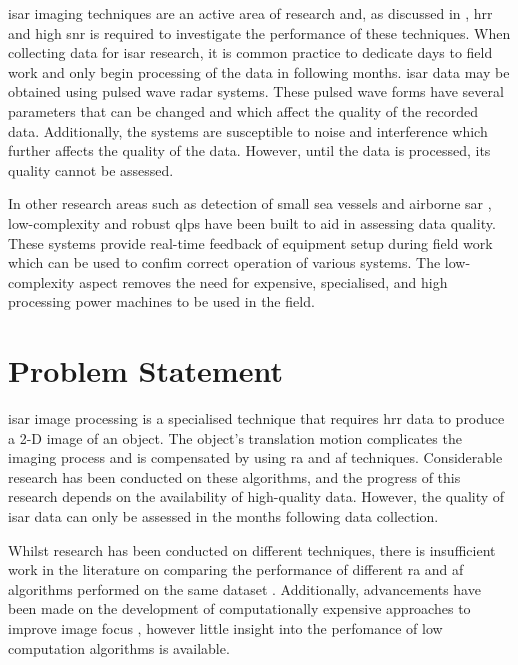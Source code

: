 \documentclass[class=report,11pt,crop=false]{standalone}
\begin{document}
\gls{isar} imaging techniques are an active area of research and, as discussed in \cite{quick-look_detection}, \gls{hrr} and high \gls{snr} is required to investigate the performance of these techniques. When collecting data for \gls{isar} research, it is common practice to dedicate days to field work and only begin processing of the data in following months. \gls{isar} data may be obtained using pulsed wave radar systems. These pulsed wave forms have several parameters that can be changed and which affect the quality of the recorded data. Additionally, the systems are susceptible to noise and interference which further affects the quality of the data. However, until the data is processed, its quality cannot be assessed.

In other research areas such as detection of small sea vessels \cite{quick-look_detection} and airborne \gls{sar} \cite{quick-look_SAR}, low-complexity and robust \gls{qlp}s have been built to aid in assessing data quality. These systems provide real-time feedback of equipment setup during field work which can be used to confim correct operation of various systems. The low-complexity aspect removes the need for expensive, specialised, and high processing power machines to be used in the field.

\section{Problem Statement}
\gls{isar} image processing is a specialised technique that requires \gls{hrr} data to produce a 2-D image of an object. The object's translation motion complicates the imaging process and is compensated by using \gls{ra} and \gls{af} techniques. Considerable research has been conducted on these algorithms, and the progress of this research depends on the availability of high-quality data. However, the quality of \gls{isar} data can only be assessed in the months following data collection.

Whilst research has been conducted on different techniques, there is insufficient work in the literature on comparing the performance of different \gls{ra} and \gls{af} algorithms performed on the same dataset \cite{4022}. Additionally, advancements have been made on the development of computationally expensive approaches to improve image focus \cite{ISARtextbook_Martorella}, however little insight into the perfomance of low computation algorithms is available. 
\end{document}
